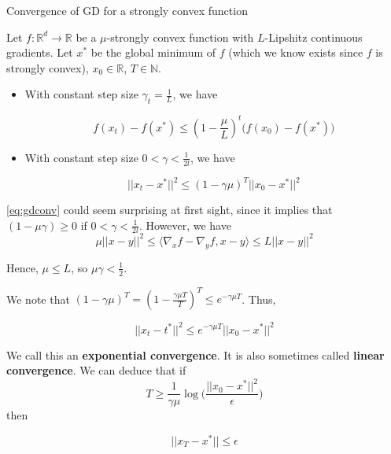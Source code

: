\documentclass[
10pt, %
a4paper, %
oneside, %
headinclude,footinclude, %
BCOR5mm, %
]{scrartcl}
\begin{document}
\begin{theorem}{Convergence of GD for a strongly convex function}

    Let $f: \mathbb{R}^d\rightarrow \mathbb{R}	$ be a  $\mu$-strongly convex function with $L$-Lipshitz continuous gradients. Let $x^*$ be the global minimum of $f$ (which we know exists since $f$ is strongly convex), $x_0\in \mathbb{R} $, $T\in \mathbb{N}$.

    \begin{itemize}
	\item With constant step size $\gamma_t = \frac{1}{L} $, we have

	    \begin{equation*}
		f(x_t)-f(x^*)\leq ( 1- \frac{\mu}{L})^t\big(f(x_0)-f(x^*)\big) 
	    \end{equation*}
        \item With constant step size $0<\gamma < \frac{1}{2l} $, we have

    \begin{equation}
	\label{eq:gdconv}
	||x_t-x^*||^2\leq (1-\gamma \mu)^T ||x_0-x^*||^2
    \end{equation}
    \end{itemize}
\end{theorem}

\begin{remark}
    \ref{eq:gdconv} could seem surprising at first sight, since it implies that $ (1-\mu\gamma)\geq 0$ if $0<\gamma< \frac{1}{2l}$. However, we have
\begin{equation*}
    \mu ||x-y||^2\leq \langle \nabla_xf-\nabla_yf, x-y \rangle \leq L||x-y||^2
\end{equation*}

Hence, $\mu\leq L$, so $\mu\gamma < \frac{1}{2} $.
\end{remark}

\begin{corollary}
    We note that $ (1-\gamma \mu)^T = (1- \frac{ \gamma \mu T}{T} )^T\leq e^{-\gamma \mu T}$. Thus,

    \begin{equation*}
	||x_t-t^*||^2\leq e^{-\gamma\mu T}||x_0-x^*||^2
    \end{equation*}

    We call this an \textbf{{exponential convergence}}. It is also sometimes called \textbf{{linear convergence}}. We can deduce that if 
    \begin{equation*}
	T \geq \frac{1}{ \gamma \mu} \log \big( \frac{||x_0-x^*||^2}{\epsilon}  \big)
    \end{equation*}
    then

    \begin{equation*}
        ||x_T-x^*||\leq \epsilon
    \end{equation*}
\end{corollary}
\end{document}
